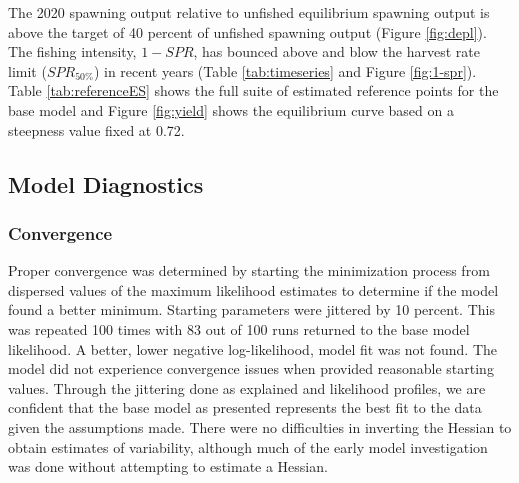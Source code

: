 \documentclass[11pt,
  english,
  a4paper,
]{article}
\begin{document}
\leavevmode\tagmcend\tagstructend\par


The 2020 spawning output relative to unfished equilibrium spawning output is above the target of 40 percent of unfished spawning output (Figure \ref{fig:depl}). The fishing intensity, {\(1-SPR\)\leavevmode\tagmcend\tagstructend}, has bounced above and blow the harvest rate limit ({\(SPR_{50\%}\)\leavevmode\tagmcend\tagstructend}) in recent years (Table \ref{tab:timeseries} and Figure \ref{fig:1-spr}). Table \ref{tab:referenceES} shows the full suite of estimated reference points for the base model and Figure \ref{fig:yield} shows the equilibrium curve based on a steepness value fixed at 0.72.

\leavevmode\tagmcend\tagstructend\par


\hypertarget{model-diagnostics}{%
\subsection{Model Diagnostics}\label{model-diagnostics}}

\leavevmode\tagmcend\tagstructend


\hypertarget{convergence}{%
\subsubsection{Convergence}\label{convergence}}

\leavevmode\tagmcend\tagstructend


Proper convergence was determined by starting the minimization process from dispersed values of the maximum likelihood estimates to determine if the model found a better minimum. Starting parameters were jittered by 10 percent. This was repeated 100 times with 83 out of 100 runs returned to the base model likelihood. A better, lower negative log-likelihood, model fit was not found. The model did not experience convergence issues when provided reasonable starting values. Through the jittering done as explained and likelihood profiles, we are confident that the base model as presented represents the best fit to the data given the assumptions made. There were no difficulties in inverting the Hessian to obtain estimates of variability, although much of the early model investigation was done without attempting to estimate a Hessian.
\end{document}
